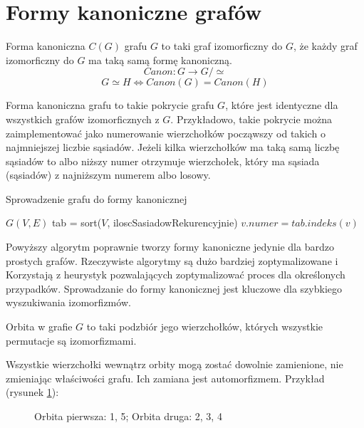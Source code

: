   \section{Formy kanoniczne grafów}

  \begin{definition}
    Forma kanoniczna $C(G)$ grafu $G$ to taki graf izomorficzny do $G$, że każdy graf izomorficzny do $G$ ma taką samą formę kanoniczną\cite{canon}. 
    $$ Canon \colon G \to G / \simeq $$
    $$G \simeq H \iff Canon(G) = Canon(H) $$
  \end{definition}

  Forma kanoniczna grafu to takie pokrycie grafu $G$, 
  które jest identyczne dla wszystkich grafów izomorficznych z $G$. Przykładowo, takie pokrycie można zaimplementować
   jako numerowanie wierzchołków począwszy od takich o najmniejszej liczbie sąsiadów. 
   Jeżeli kilka wierzchołków ma taką samą liczbę sąsiadów to albo niższy numer otrzymuje wierzchołek, 
   który ma sąsiada (sąsiadów) z najniższym numerem albo losowy.


   \begin{algorithm}[H]
    \caption{Sprowadzenie grafu do formy kanonicznej}
    \begin{algorithmic}
    \REQUIRE $G(V, E) $
    \STATE tab = sort($V$, iloscSasiadowRekurencyjnie)
      \STATE $v.numer = tab.indeks(v) $
    \ENDFOR
    \end{algorithmic}
  \end{algorithm}
  
  Powyższy algorytm poprawnie tworzy formy kanoniczne jedynie dla bardzo prostych grafów.
  Rzeczywiste algorytmy są dużo bardziej zoptymalizowane i Korzystają z 
  heurystyk pozwalających zoptymalizować proces dla określonych przypadków\cite{canon}.
  Sprowadzanie do formy kanonicznej jest kluczowe dla szybkiego wyszukiwania izomorfizmów. 

\begin{definition}[Orbita]
  Orbita w grafie $G$ to taki podzbiór jego wierzchołków, których wszystkie permutacje są izomorfizmami.
\end{definition}

Wszystkie wierzchołki wewnątrz orbity mogą zostać dowolnie zamienione, nie zmieniając właściwości grafu. Ich zamiana jest automorfizmem.
Przykład (rysunek \ref{orbit}): 
\begin{figure}[H]
  \centering
    \caption{Orbita pierwsza: 1, 5; Orbita druga: 2, 3, 4}
    \label{orbit}
 \end{figure}


